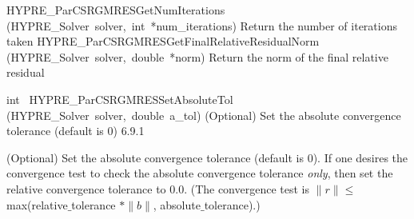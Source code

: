 \documentclass{article}
\begin{document}
\begin{cxxentry}
\begin{cxxentry}
\begin{cxxnames}
        {}
\label{cxx.6.9.12}
        {HYPRE\_ParCSRGMRESGetNumIterations}
        {(HYPRE\_Solver\ solver,\ int\ *num\_iterations)}
        {
Return the number of iterations taken}
        {}
\label{cxx.6.9.13}
        {HYPRE\_ParCSRGMRESGetFinalRelativeResidualNorm}
        {(HYPRE\_Solver\ solver,\ double\ *norm)}
        {
Return the norm of the final relative residual}
        {}
\label{cxx.6.9.14}
\end{cxxnames}
\begin{cxxfunction}
{int\ }
        {HYPRE\_ParCSRGMRESSetAbsoluteTol}
        {(HYPRE\_Solver\ solver,\ double\ a\_tol)}
        {
(Optional) Set the absolute convergence tolerance (default is 0)}
        {6.9.1}
\begin{cxxdoc}

(Optional) Set the absolute convergence tolerance (default is 0). 
If one desires
the convergence test to check the absolute convergence tolerance {\it only}, then
set the relative convergence tolerance to 0.0.  (The convergence test is 
$\|r\| \leq$ max(relative$\_$tolerance $\ast \|b\|$, absolute$\_$tolerance).)


\end{cxxdoc}
\end{cxxfunction}
\end{cxxentry}
\end{cxxentry}
\end{document}
